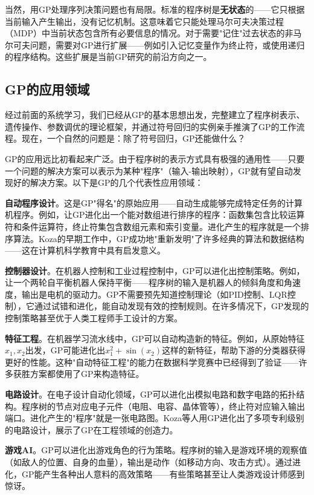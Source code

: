 \documentclass[lang=cn,zihao=-4,a4paper,fontset=windows]{beautybook}
\begin{document}
当然，用GP处理序列决策问题也有局限。标准的程序树是\textbf{无状态}的——它只根据当前输入产生输出，没有记忆机制。这意味着它只能处理马尔可夫决策过程（MDP）中当前状态包含所有必要信息的情况。对于需要"记住"过去状态的非马尔可夫问题，需要对GP进行扩展——例如引入记忆变量作为终止符，或使用递归的程序结构。这些扩展是当前GP研究的前沿方向之一。

\subsection{GP的应用领域}

经过前面的系统学习，我们已经从GP的基本思想出发，完整建立了程序树表示、遗传操作、参数调优的理论框架，并通过符号回归的实例亲手推演了GP的工作流程。现在，一个自然的问题是：除了符号回归，GP还能做什么？

GP的应用远比初看起来广泛。由于程序树的表示方式具有极强的通用性——只要一个问题的解决方案可以表示为某种"程序"（输入-输出映射），GP就有望自动发现好的解决方案。以下是GP的几个代表性应用领域：

\textbf{自动程序设计}。这是GP"得名"的原始应用——自动生成能够完成特定任务的计算机程序。例如，让GP进化出一个能对数组进行排序的程序：函数集包含比较运算符和条件运算符，终止符集包含数组元素和索引变量。进化产生的程序就是一个排序算法。Koza的早期工作中，GP成功地"重新发明"了许多经典的算法和数据结构——这在计算机科学教育中具有启发意义。

\textbf{控制器设计}。在机器人控制和工业过程控制中，GP可以进化出控制策略。例如，让一个两轮自平衡机器人保持平衡——程序树的输入是机器人的倾斜角度和角速度，输出是电机的驱动力。GP不需要预先知道控制理论（如PID控制、LQR控制），它通过试错和进化，能自动发现有效的控制规则。在许多情况下，GP发现的控制策略甚至优于人类工程师手工设计的方案。

\textbf{特征工程}。在机器学习流水线中，GP可以自动构造新的特征。例如，从原始特征$x_1, x_2$出发，GP可能进化出$x_1^2 + \sin(x_2)$这样的新特征，帮助下游的分类器获得更好的性能。这种"自动特征工程"的能力在数据科学竞赛中已经得到了验证——许多获胜方案都使用了GP来构造特征。

\textbf{电路设计}。在电子设计自动化领域，GP可以进化出模拟电路和数字电路的拓扑结构。程序树的节点对应电子元件（电阻、电容、晶体管等），终止符对应输入输出端口。进化产生的"程序"就是一张电路图。Koza等人用GP进化出了多项专利级别的电路设计，展示了GP在工程领域的创造力。

\textbf{游戏AI}。GP可以进化出游戏角色的行为策略。程序树的输入是游戏环境的观察值（如敌人的位置、自身的血量），输出是动作（如移动方向、攻击方式）。通过进化，GP能产生各种出人意料的高效策略——有些策略甚至让人类游戏设计师感到惊讶。
\end{document}
